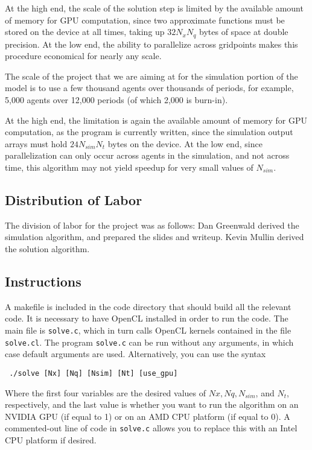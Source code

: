 \documentclass[a4paper,12pt]{article}
\numberwithin{equation}{section}
\theoremstyle{definition}
\begin{document}
At the high end, the scale of the solution step is limited by the
available amount of memory for GPU computation, since two approximate
functions must be stored on the device at all times, taking up $32 N_x
N_q$ bytes of space at double precision. At the low end, the ability
to parallelize across gridpoints makes this procedure economical for
nearly any scale.

The scale of the project that we are aiming at for the simulation
portion of the model is to use a few thousand agents over thousands of
periods, for example, 5,000 agents over 12,000 periods (of which 2,000
is burn-in).

At the high end, the limitation is again the available amount of
memory for GPU computation, as the program is currently written, since
the simulation output arrays must hold $24 N_{sim} N_t$ bytes on the
device. At the low end, since parallelization can only occur across
agents in the simulation, and not across time, this algorithm may not
yield speedup for very small values of $N_{sim}$.

\subsection{Distribution of Labor}

The division of labor for the project was as follows: Dan
Greenwald derived the simulation algorithm, and prepared the slides
and writeup. Kevin Mullin derived the solution algorithm.

\subsection{Instructions}

A makefile is included in the code directory that should build all the
relevant code. It is necessary to have OpenCL installed in order to
run the code. The main file is \texttt{solve.c}, which in turn calls
OpenCL kernels contained in the file \texttt{solve.cl}. The program
\texttt{solve.c} can be run without any arguments, in which case
default arguments are used. Alternatively, you can use the syntax

\texttt{ ./solve [Nx] [Nq] [Nsim] [Nt] [use\_gpu] }

Where the first four variables are the desired values of $Nx, Nq,
N_{sim}$, and $N_t$, respectively, and the last value is whether you
want to run the algorithm on an NVIDIA GPU (if equal to 1) or on an
AMD CPU platform (if equal to 0). A commented-out line of code in
\texttt{solve.c} allows you to replace this with an Intel CPU platform if
desired.
\end{document}
